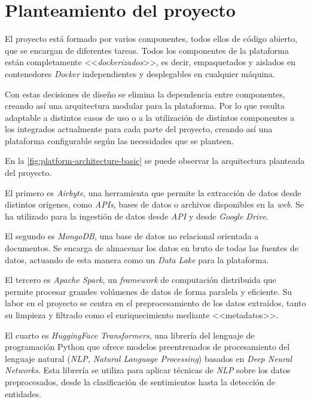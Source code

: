 \section{Planteamiento del proyecto}

El proyecto está formado por varios componentes, todos ellos de código abierto, que se encargan de diferentes tareas. Todos los componentes de la plataforma están completamente <<\textit{dockerizados}>>, es decir, empaquetados y aislados en contenedores \textit{Docker} independientes y desplegables en cualquier máquina.

Con estas decisiones de diseño se elimina la dependencia entre componentes, creando así una arquitectura modular para la plataforma. Por lo que resulta adaptable a distintos casos de uso o a la utilización de distintos componentes a los integrados actualmente para cada parte del proyecto, creando así una plataforma configurable según las necesidades que se planteen. 

En la \autoref{fig:platform-architecture-basic} se puede observar la arquitectura planteada del proyecto.


El primero es \textit{Airbyte}, una herramienta que permite la extracción de datos desde distintos orígenes, como \textit{APIs}, bases de datos o archivos disponibles en la \textit{web}. Se ha utilizado para la ingestión de datos desde \textit{API} y desde \textit{Google Drive}.

El segundo es \textit{MongoDB}, una base de datos no relacional orientada a documentos. Se encarga de almacenar los datos en bruto de todas las fuentes de datos, actuando de esta manera como un \textit{Data Lake} para la plataforma.

El tercero es \textit{Apache Spark}, un \textit{framework} de computación distribuida que permite procesar grandes volúmenes de datos de forma paralela y eficiente. Su labor en el proyecto se centra en el preprocesamiento de los datos extraídos, tanto su limpieza y filtrado como el enriquecimiento mediante <<metadatos>>.

El cuarto es \textit{HuggingFace Transformers}, una librería del lenguaje de programación Python que ofrece modelos preentrenados de procesamiento del lenguaje natural (\textit{NLP, Natural Language Processing}) basados en \textit{Deep Neural Networks}. Esta librería se utiliza para aplicar técnicas de \textit{NLP} sobre los datos preprocesados, desde la clasificación de sentimientos hasta la detección de entidades. 

